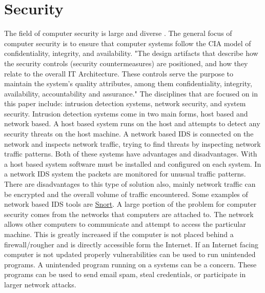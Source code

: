 \documentclass[12pt]{article}
\begin{document}
\section{Security}
The field of computer security is large and diverse \cite{ComputerSecurity}. The general focus of computer security is to ensure that computer systems follow the CIA model of confidentiality, integrity, and availability. "The design artifacts that describe how the security controls (security countermeasures) are positioned, and how they relate to the overall IT Architecture. These controls serve the purpose to maintain the system's quality attributes, among them confidentiality, integrity, availability, accountability and assurance." \cite{it_security_architecture} The disciplines that are focused on in this paper include: intrusion detection systems, network security, and system security.
Intrusion detection systems come in two main forms, host based and network based. A host based system runs on the host and attempts to detect any security threats on the host machine. A network based IDS is connected on the network and inspects network traffic, trying to find threats by inspecting network traffic patterns. Both of these systems have advantages and disadvantages. With a host based system software must be installed and configured on each system. In a network IDS system the packets are monitored for unusual traffic patterns. There are disadvantages to this type of solution also, mainly network traffic can be encrypted and the overall volume of traffic encountered. Some examples of network based IDS tools are \href{https://www.snort.org/}{Snort}.
A large portion of the problem for computer security comes from the networks that computers are attached to. The network allows other computers to communicate and attempt to access the particular machine. This is greatly increased if the computer is not placed behind a firewall/rougher and is directly accessible form the Internet. If an Internet facing computer is not updated properly vulnerabilities can be used to run unintended programs.
A unintended program running on a systems can be a concern. These programs can be used to send email spam, steal credentials, or participate in larger network attacks.

\end{document}
